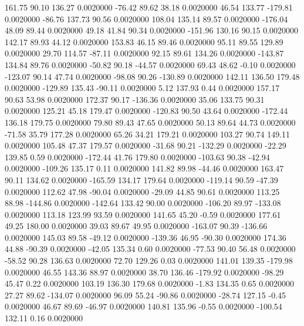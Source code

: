   161.75   90.10  136.27   0.0020000
  -76.42   89.62   38.18   0.0020000
   46.54  133.77 -179.81   0.0020000
  -86.76  137.73   90.56   0.0020000
  108.04  135.14   89.57   0.0020000
 -176.04   48.09   89.44   0.0020000
   49.18   41.84   90.34   0.0020000
 -151.96  130.16   90.15   0.0020000
  142.17   89.93   44.12   0.0020000
  153.83   46.15   89.46   0.0020000
   95.11   89.55  129.89   0.0020000
   29.70  114.57  -87.11   0.0020000
   92.15   89.61  134.26   0.0020000
 -143.87  134.84   89.76   0.0020000
  -50.82   90.18  -44.57   0.0020000
   69.43   48.62   -0.10   0.0020000
 -123.07   90.14   47.74   0.0020000
  -98.08   90.26 -130.89   0.0020000
  142.11  136.50  179.48   0.0020000
 -129.89  135.43  -90.11   0.0020000
    5.12  137.93    0.44   0.0020000
  157.17   90.63   53.98   0.0020000
  172.37   90.17 -136.36   0.0020000
   35.06  133.75   90.31   0.0020000
  125.21   45.18  179.47   0.0020000
 -120.83   90.50   43.64   0.0020000
 -172.44  136.18  179.75   0.0020000
   79.80   89.43   47.65   0.0020000
   50.13   89.64   44.73   0.0020000
  -71.58   35.79  177.28   0.0020000
   65.26   34.21  179.21   0.0020000
  103.27   90.74  149.11   0.0020000
  105.48   47.37  179.57   0.0020000
  -31.68   90.21 -132.29   0.0020000
  -22.29  139.85    0.59   0.0020000
 -172.44   41.76  179.80   0.0020000
 -103.63   90.38  -42.94   0.0020000
 -109.26  135.17    0.11   0.0020000
  141.82   89.98  -44.46   0.0020000
  163.47   90.11  134.62   0.0020000
 -165.59  134.17  179.64   0.0020000
 -119.14   90.59  -47.39   0.0020000
  112.62   47.98  -90.04   0.0020000
  -29.09   44.85   90.61   0.0020000
  113.25   88.98 -144.86   0.0020000
 -142.64  133.42   90.00   0.0020000
 -106.20   89.97 -133.08   0.0020000
  113.18  123.99   93.59   0.0020000
  141.65   45.20   -0.59   0.0020000
  177.61   49.25  180.00   0.0020000
   39.03   89.67   49.95   0.0020000
 -163.07   90.39 -136.66   0.0020000
  145.03   89.58  -49.12   0.0020000
 -139.36   46.95  -90.30   0.0020000
  174.36   44.88  -90.39   0.0020000
  -42.05  135.34    0.60   0.0020000
  -77.53   90.40   56.48   0.0020000
  -58.52   90.28  136.63   0.0020000
   72.70  129.26    0.03   0.0020000
  141.01  139.35 -179.98   0.0020000
   46.55  143.36   88.97   0.0020000
   38.70  136.46 -179.92   0.0020000
  -98.29   45.47    0.22   0.0020000
  103.19  136.30  179.68   0.0020000
   -1.83  134.35    0.65   0.0020000
   27.27   89.62 -134.07   0.0020000
   96.09   55.24  -90.86   0.0020000
  -28.74  127.15   -0.45   0.0020000
   46.67   89.69  -46.97   0.0020000
  140.81  135.96   -0.55   0.0020000
 -100.54  132.11    0.16   0.0020000
